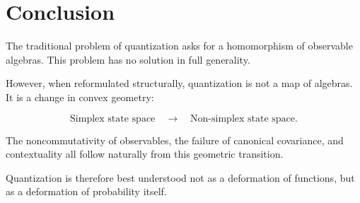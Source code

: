 \documentclass[11pt]{article}
\begin{document}
\section{Conclusion}

The traditional problem of quantization
asks for a homomorphism of observable algebras.
This problem has no solution in full generality.

However, when reformulated structurally,
quantization is not a map of algebras.
It is a change in convex geometry:

\begin{equation}
\text{Simplex state space}
\quad \longrightarrow \quad
\text{Non-simplex state space}.
\end{equation}

The noncommutativity of observables,
the failure of canonical covariance,
and contextuality
all follow naturally from this geometric transition.

Quantization is therefore best understood
not as a deformation of functions,
but as a deformation of probability itself.
\end{document}
